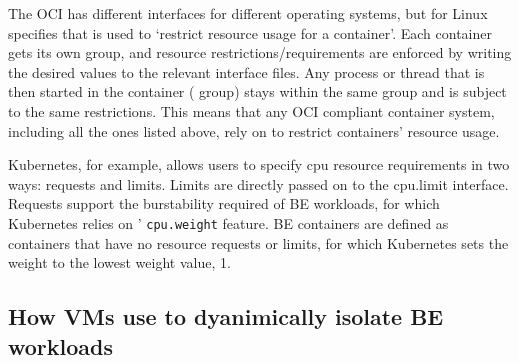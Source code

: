 The OCI has different interfaces for different operating systems, but for Linux
specifies that \cgroups{} is used to `restrict resource usage for a container'.
Each container gets its own group, and resource restrictions/requirements are
enforced by writing the desired values to the relevant \cgroups{} interface
files. Any process or thread that is then started in the container (\ie{} group)
stays within the same group and is subject to the same restrictions. This means
that any OCI compliant container system, including all the ones listed above,
rely on \cgroups{} to restrict containers' resource usage.

Kubernetes\cite{TODO}, for example, allows users to specify cpu resource
requirements in two ways: requests and limits. Limits are directly passed on to
the \cgroups{} cpu.limit interface. Requests support the burstability required
of BE workloads, for which Kubernetes relies on \cgroups{}' \texttt{cpu.weight}
feature. BE containers are defined as containers that have no resource requests
or limits, for which Kubernetes sets the weight to the lowest weight value,
\ie{} 1.










\subsection{How VMs use \cgroups{} to dyanimically isolate BE workloads}

